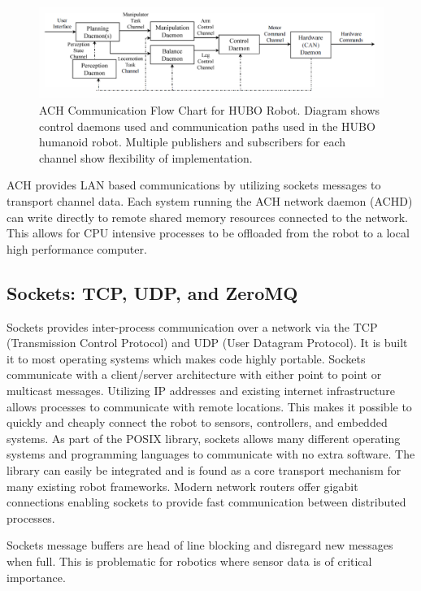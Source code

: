 \begin{figure}[tbhp]
 \centering
 \includegraphics[width=2.0\columnwidth]{./images/achflow.png}
  \caption{ACH Communication Flow Chart for HUBO Robot\cite{REALTIMEACH}. Diagram shows control daemons used and communication paths used in the HUBO humanoid robot. Multiple publishers and subscribers for each channel show flexibility of implementation.}
  \label{fig:ach diagram}
\end{figure} 

ACH provides LAN based communications by utilizing sockets messages to transport channel data. Each system running the ACH network daemon (ACHD) can write directly to remote shared memory resources connected to the network\cite{ACHHUBO}. This allows for CPU intensive processes to be offloaded from the robot to a local high performance computer. 

\subsection{Sockets: TCP, UDP, and ZeroMQ}

Sockets provides inter-process communication over a network via the TCP (Transmission Control Protocol) and UDP (User Datagram Protocol). It is built it to most operating systems which makes code highly portable. Sockets communicate with a client/server architecture with either point to point or multicast messages\cite{UDPMULTICAST}. Utilizing IP addresses and existing internet infrastructure allows processes to communicate with remote locations. This makes it possible to quickly and cheaply connect the robot to sensors, controllers, and embedded systems. As part of the POSIX library, sockets allows many different operating systems and programming languages to communicate with no extra software\cite{ACHLIBRARY, UDPTCP}. The library can easily be integrated and is found as a core transport mechanism for many existing robot frameworks\cite{SEAR}. Modern network routers offer gigabit connections enabling sockets to provide fast communication between distributed processes.

Sockets message buffers are head of line blocking and disregard new messages when full\cite{REALTIMEACH}. This is problematic for robotics where sensor data is of critical importance. 

